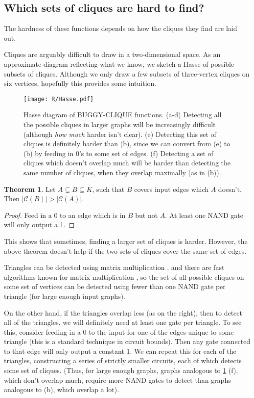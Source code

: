 \documentclass[12pt]{article}
\theoremstyle{definition}
\newtheorem{thm}{Theorem}[section]
\newcommand{\bigC}[0]{\mathcal{C}}
\begin{document}
\subsection{Which sets of cliques are hard to find?}
\label{sec:whichCliques}

The hardness of these functions depends
on how the cliques they find are laid out.

Cliques are arguably difficult to draw in a two-dimensional space.
As an approximate diagram reflecting what we know,
we sketch a Hasse of possible subsets of cliques. Although
we only draw a few subsets of three-vertex cliques
on six vertices, hopefully this provides some
intuition.

\begin{figure}
\centering
\texttt{[image: R/Hasse.pdf]}
\caption{Hasse diagram of BUGGY-CLIQUE functions.
(a-d) 
Detecting all the possible cliques in larger graphs will be
increasingly difficult (although {\em how much} harder isn't clear).
(e) 
Detecting this set of cliques is definitely harder than (b),
since we can convert from (e) to (b) by feeding in 0's to
some set of edges.
(f) Detecting a set of cliques which doesn't overlap much will be
harder than detecting the same number of cliques, when they overlap
maximally (as in (b)).}
\label{fig:Hasse}
\end{figure}


\begin{thm}
\label{edgeZonking}
Let $A \subsetneq B \subseteq K$, such that $B$ covers input edges
which $A$ doesn't. Then $|\bigC(B)| > |\bigC(A)|$.
\end{thm}
\begin{proof}
Feed in a 0 to an edge which is in $B$ but not $A$. At least one
NAND gate will only output a 1.
\end{proof}

This shows that sometimes, finding a larger set of cliques is
harder. However, the above theorem doesn't help if the two
sets of cliques cover the same set of edges.

Triangles can be detected using matrix multiplication \cite{itai_finding_1977},
and there are fast algorithms known for matrix multiplication
\cite{strassen_gaussian_1969}
\cite{williams_multiplying_2012}, so the set of all possible
cliques on some set of vertices
 can be detected
using fewer than one NAND gate per triangle (for large enough input graphs).

On the other hand, if the triangles overlap less (as on the right),
then to detect all of the triangles, we will definitely need at least one
gate per triangle.
To see this, consider feeding in a 0 to the input for one
of the edges unique to some triangle (this is a
standard technique in circuit bounds).
Then any gate connected to
that edge will only output a constant 1. We can repeat this for each of the
triangles, constructing a series of strictly smaller circuits, each of which 
detects some set of cliques. (Thus, for large enough graphs,
graphs analogous to \ref{fig:Hasse} (f), which don't overlap much,
require more NAND gates to detect than graphs 
analogous to (b), which overlap
a lot).
\end{document}
